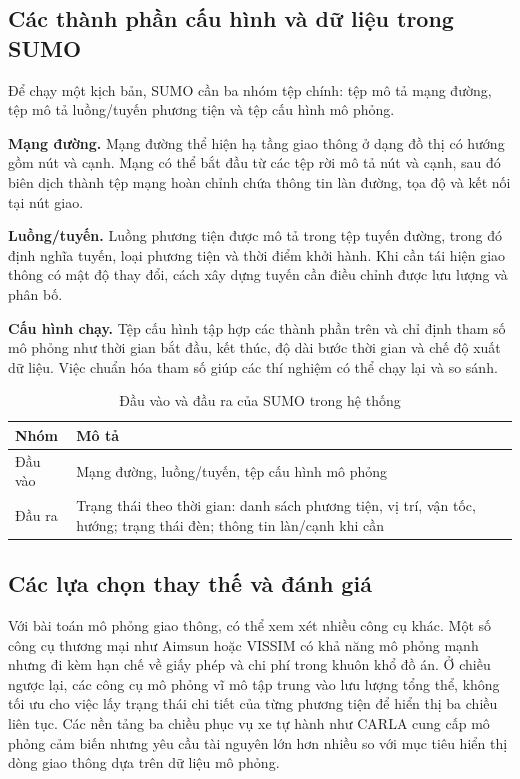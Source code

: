 ﻿\documentclass[../DoAn.tex]{subfiles}
\begin{document}
\subsection{Các thành phần cấu hình và dữ liệu trong SUMO}

Để chạy một kịch bản, \gls{SUMO} cần ba nhóm tệp chính: tệp mô tả mạng đường, tệp
mô tả luồng/tuyến phương tiện và tệp cấu hình mô phỏng.

\textbf{Mạng đường.} Mạng đường thể hiện hạ tầng giao thông ở dạng đồ thị có
hướng gồm nút và cạnh. Mạng có thể bắt đầu từ các tệp rời mô tả nút và cạnh, sau
đó biên dịch thành tệp mạng hoàn chỉnh chứa thông tin làn đường, tọa độ và kết
nối tại nút giao.

\textbf{Luồng/tuyến.} Luồng phương tiện được mô tả trong tệp tuyến đường, trong
đó định nghĩa tuyến, loại phương tiện và thời điểm khởi hành. Khi cần tái hiện
giao thông có mật độ thay đổi, cách xây dựng tuyến cần điều chỉnh được lưu lượng
và phân bố.

\textbf{Cấu hình chạy.} Tệp cấu hình tập hợp các thành phần trên và chỉ định tham
số mô phỏng như thời gian bắt đầu, kết thúc, độ dài bước thời gian và chế độ xuất
dữ liệu. Việc chuẩn hóa tham số giúp các thí nghiệm có thể chạy lại và so sánh.

\begin{table}[htbp]
	\centering
	\caption{Đầu vào và đầu ra của SUMO trong hệ thống}
	\label{tab:sumo-io}
	\begin{tabular}{|p{}|p{}|}
		\hline
		\textbf{Nhóm} & \textbf{Mô tả} \\
		\hline
		Đầu vào & Mạng đường, luồng/tuyến, tệp cấu hình mô phỏng \\ \hline
		Đầu ra & Trạng thái theo thời gian: danh sách phương tiện, vị trí, vận tốc, hướng; trạng thái đèn; thông tin làn/cạnh khi cần \\
		\hline
	\end{tabular}
\end{table}

\subsection{Các lựa chọn thay thế và đánh giá}

Với bài toán mô phỏng giao thông, có thể xem xét nhiều công cụ khác. Một số công
cụ thương mại như Aimsun hoặc VISSIM có khả năng mô phỏng mạnh nhưng đi kèm hạn
chế về giấy phép và chi phí trong khuôn khổ đồ án. Ở chiều ngược lại, các công cụ
mô phỏng vĩ mô tập trung vào lưu lượng tổng thể, không tối ưu cho việc lấy trạng
thái chi tiết của từng phương tiện để hiển thị ba chiều liên tục. Các nền tảng ba
chiều phục vụ xe tự hành như CARLA cung cấp mô phỏng cảm biến nhưng yêu cầu tài
nguyên lớn hơn nhiều so với mục tiêu hiển thị dòng giao thông dựa trên dữ liệu mô
phỏng.
\end{document}

